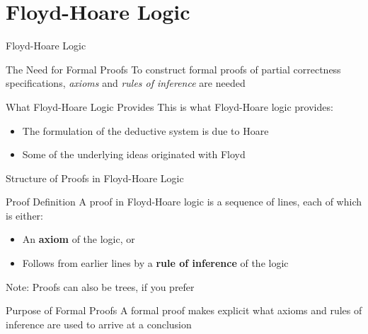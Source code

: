 \section{Floyd-Hoare Logic}

\begin{frame}{Floyd-Hoare Logic}
    \begin{block}{The Need for Formal Proofs}
        To construct formal proofs of partial correctness specifications, \emph{axioms} and \emph{rules of inference} are needed
    \end{block}
    
    \begin{block}{What Floyd-Hoare Logic Provides}
        This is what Floyd-Hoare logic provides:
        \begin{itemize}
            \item The formulation of the deductive system is due to Hoare
            \item Some of the underlying ideas originated with Floyd
        \end{itemize}
    \end{block}
\end{frame}

\begin{frame}{Structure of Proofs in Floyd-Hoare Logic}
    \begin{block}{Proof Definition}
        A proof in Floyd-Hoare logic is a sequence of lines, each of which is either:
        \begin{itemize}
            \item An \textbf{axiom} of the logic, or
            \item Follows from earlier lines by a \textbf{rule of inference} of the logic
        \end{itemize}
        
        Note: Proofs can also be trees, if you prefer
    \end{block}
    
    \begin{block}{Purpose of Formal Proofs}
        A formal proof makes explicit what axioms and rules of inference are used to arrive at a conclusion
    \end{block}
\end{frame}


